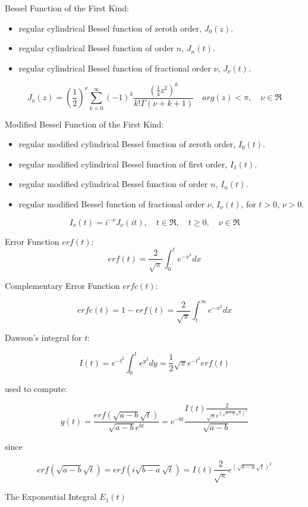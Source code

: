 \documentclass[10pt]{article}
\begin{document}
Bessel Function of the First Kind:\\
\begin{itemize}
\item	regular cylindrical Bessel function of zeroth order, $J_0(z)$.
\item	regular cylindrical Bessel function of order $n$, $J_n(t)$.
\item	regular cylindrical Bessel function of fractional order $\nu$, $J_{\nu}(t)$.
\end{itemize}

$$J_{\nu}(z) = \left (\frac{1}{2}\right )^{\nu}\sum_{k=0}^{\infty}(-1)^{k}\frac{(\frac{1}{4}z^{2})^{k}}{k!\Gamma(\nu + k+ 1)}\quad arg(z) < \pi, \quad \nu \in \Re$$


Modified Bessel Function of the First Kind:\\
\begin{itemize}
\item	regular modified cylindrical Bessel function of zeroth order, $I_0(t)$.
\item	regular modified cylindrical Bessel function of first order, $I_1(t)$.
\item	regular modified cylindrical Bessel function of order $n$, $I_n(t)$.
\item	regular modified Bessel function of fractional order $\nu$, $I_{\nu}(t)$,  for $t>0$, $\nu>0$.
\end{itemize}


$$ I_{\nu}(t) = i^{-\nu}J_{\nu}(it), \quad t\in \Re, \quad t \geq 0, \quad \nu \in \Re$$


Error Function $erf(t)$:
$$ erf(t) = \frac{2}{\sqrt{\pi}}\int_0^t e^{-x^{2}}dx $$


Complementary Error Function $erfc(t)$:

$$erfc(t) = 1-erf(t) = \frac{2}{\sqrt{\pi}}\int_t^{\infty}e^{-x^{2}}dx $$

Dawson's integral for $t$:

$$I(t) = e^{-t^{2}}\int_0^te^{y^{2}}dy= \frac{1}{2}\sqrt{\pi}e^{-t^{2}}erf(t)$$

used to compute:

$$g(t) = \frac{erf(\sqrt{a-b}\sqrt{t})}{\sqrt{a-b}e^{bt}}=e^{-bt}\frac{I(t)\frac{2}{\sqrt{\pi}e^{(\sqrt{b-a}\sqrt{t})^{2}}}}{\sqrt{a-b}}$$

since


$$ erf(\sqrt{a-b}\sqrt{t})=erf (i\sqrt{b-a}\sqrt{t})= I(t) \frac{2}{\sqrt{\pi}}e^{(\sqrt{b-a}\sqrt{t})^{2}}$$


The Exponential Integral $E_1(t)$
\end{document}
